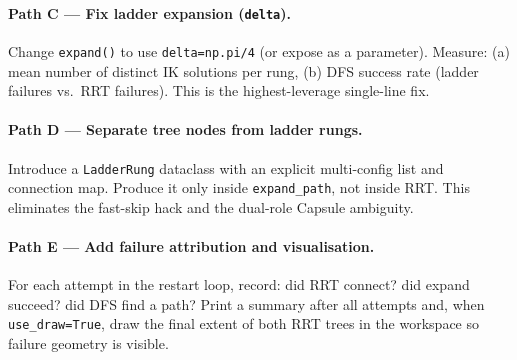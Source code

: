 \documentclass[11pt]{article}
\begin{document}
\paragraph{Path C — Fix ladder expansion (\texttt{delta}).}
Change \texttt{expand()} to use \texttt{delta=np.pi/4} (or expose as a parameter).
Measure: (a) mean number of distinct IK solutions per rung, (b) DFS success rate
(ladder failures vs.\ RRT failures).  This is the highest-leverage single-line fix.

\paragraph{Path D — Separate tree nodes from ladder rungs.}
Introduce a \texttt{LadderRung} dataclass with an explicit multi-config list and
connection map.  Produce it only inside \texttt{expand\_path}, not inside RRT.
This eliminates the fast-skip hack and the dual-role Capsule ambiguity.

\paragraph{Path E — Add failure attribution and visualisation.}
For each attempt in the restart loop, record: did RRT connect? did expand succeed?
did DFS find a path?  Print a summary after all attempts and, when \texttt{use\_draw=True},
draw the final extent of both RRT trees in the workspace so failure geometry is visible.
\end{document}
